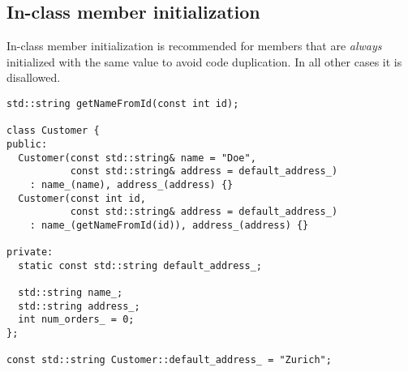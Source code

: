 \subsection{In-class member initialization}

In-class member initialization is recommended for members that are \emph{always} initialized with the same value to avoid code duplication.
In all other cases it is disallowed.

\begin{lstlisting}[showspaces=false]
std::string getNameFromId(const int id);

class Customer {
public:
  Customer(const std::string& name = "Doe",
           const std::string& address = default_address_)
    : name_(name), address_(address) {}
  Customer(const int id,
           const std::string& address = default_address_)
    : name_(getNameFromId(id)), address_(address) {}

private:
  static const std::string default_address_;

  std::string name_;
  std::string address_;
  int num_orders_ = 0;
};

const std::string Customer::default_address_ = "Zurich";
\end{lstlisting}

